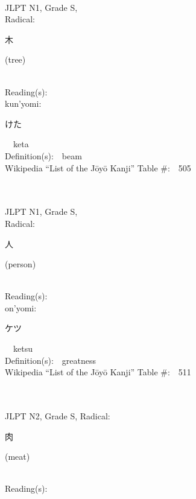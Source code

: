 \begin{multicols}{2}
{\fontsize{34pt}{40pt}  }\ \ \\
{JLPT N1, Grade S, \\Radical:\ \ {\begin{CJK}{UTF8}{min} 木 \end{CJK}} (tree) } \\
Reading(s):\ \ \\
{\hspace*{1em}}kun'yomi:\ \ \\
{\hspace*{2em}}{\begin{CJK}{UTF8}{min} けた \end{CJK}}\ \ keta\ \ \\
Definition(s):\ \ beam \\
Wikipedia ``List of the J\=oy\=o Kanji'' Table \#:\ \ 505 \\
\ \ \\
{\fontsize{34pt}{40pt}  }\ \ \\
{JLPT N1, Grade S, \\Radical:\ \ {\begin{CJK}{UTF8}{min} 人 \end{CJK}} (person) } \\
Reading(s):\ \ \\
{\hspace*{1em}}on'yomi:\ \ \\
{\hspace*{2em}}{\begin{CJK}{UTF8}{min} ケツ \end{CJK}}\ \ ketsu\ \ \\
Definition(s):\ \ greatness \\
Wikipedia ``List of the J\=oy\=o Kanji'' Table \#:\ \ 511 \\
\ \ \\
{\fontsize{34pt}{40pt}  }\ \ \\  %
{JLPT N2, Grade S, Radical:\ \ {\begin{CJK}{UTF8}{min} 肉 \end{CJK}} (meat) } \\
Reading(s):\ \ \\

\end{multicols}
